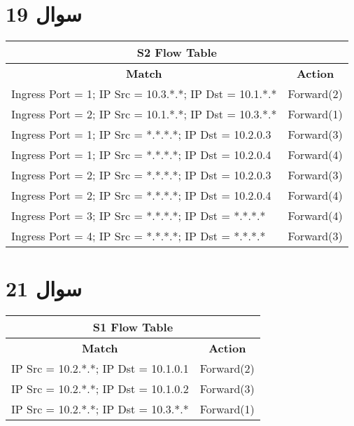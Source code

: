 \documentclass{article}
\begin{document}
\section{سوال 19}
\begin{latin}
\begin{table}[H]
\begin{tabular}{|lc|}
\hline
\multicolumn{2}{|c|}{\textbf{S2 Flow Table}}                                                   \\ \hline
\multicolumn{1}{|c|}{\textbf{Match}}                                         & \textbf{Action} \\ \hline
\multicolumn{1}{|l|}{Ingress Port = 1; IP Src = 10.3.*.*; IP Dst = 10.1.*.*} & Forward(2)      \\ \hline
\multicolumn{1}{|l|}{Ingress Port = 2; IP Src = 10.1.*.*; IP Dst = 10.3.*.*} & Forward(1)      \\ \hline
\multicolumn{1}{|l|}{Ingress Port = 1; IP Src = *.*.*.*; IP Dst = 10.2.0.3}  & Forward(3)      \\ \hline
\multicolumn{1}{|l|}{Ingress Port = 1; IP Src = *.*.*.*; IP Dst = 10.2.0.4}  & Forward(4)      \\ \hline
\multicolumn{1}{|l|}{Ingress Port = 2; IP Src = *.*.*.*; IP Dst = 10.2.0.3}  & Forward(3)      \\ \hline
\multicolumn{1}{|l|}{Ingress Port = 2; IP Src = *.*.*.*; IP Dst = 10.2.0.4}  & Forward(4)      \\ \hline
\multicolumn{1}{|l|}{Ingress Port = 3; IP Src = *.*.*.*; IP Dst = *.*.*.*}   & Forward(4)      \\ \hline
\multicolumn{1}{|l|}{Ingress Port = 4; IP Src = *.*.*.*; IP Dst = *.*.*.*}   & Forward(3)      \\ \hline
\end{tabular}
\end{table}
\end{latin}

\section{سوال 21}
\begin{latin}
\begin{table}[H]
\begin{tabular}{|lc|}
\hline
\multicolumn{2}{|c|}{\textbf{S1 Flow Table}}                                 \\ \hline
\multicolumn{1}{|c|}{\textbf{Match}}                       & \textbf{Action} \\ \hline
\multicolumn{1}{|l|}{IP Src = 10.2.*.*; IP Dst = 10.1.0.1} & Forward(2)      \\ \hline
\multicolumn{1}{|l|}{IP Src = 10.2.*.*; IP Dst = 10.1.0.2} & Forward(3)      \\ \hline
\multicolumn{1}{|l|}{IP Src = 10.2.*.*; IP Dst = 10.3.*.*} & Forward(1)      \\ \hline
\end{tabular}
\end{table}
\end{latin}
\end{document}
